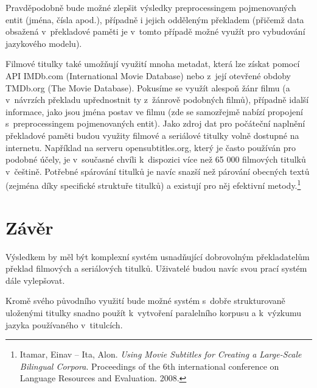 Pravděpodobně bude možné zlepšit výsledky preprocessingem pojmenovaných entit (jména, čísla apod.), případně i jejich odděleným překladem (přičemž data obsažená v~překladové paměti je v~tomto případě možné využít pro vybudování jazykového modelu).

Filmové titulky také umožňují využití mnoha metadat, která lze získat pomocí API IMDb.com (International Movie Database) nebo z~její otevřené obdoby TMDb.org (The Movie Database). Pokusíme se využít alespoň žánr filmu (a v~návrzích překladu upřednostnit ty z~žánrově podobných filmů), případně idalší informace, jako jsou jména postav ve filmu (zde se samozřejmě nabízí propojení s~preprocessingem pojmenovaných entit).
Jako zdroj dat pro počáteční naplnění překladové paměti budou využity filmové a seriálové titulky volně dostupné na internetu. Například na serveru opensubtitles.org, který je často používán pro podobné účely, je v~současné chvíli k~dispozici více než 65 000 filmových titulků v~češtině. Potřebné spárování titulků je navíc snazší než párování obecných textů (zejména díky specifické struktuře titulků) a existují pro něj efektivní metody.\footnote{Itamar, Einav – Ita, Alon. \emph{Using Movie Subtitles for Creating a Large-Scale Bilingual Corpora}. Proceedings of the 6th international conference on Language Resources and Evaluation. 2008.}

\section{Závěr}
Výsledkem by měl být komplexní systém usnadňující dobrovolným překladatelům překlad filmových a seriálových titulků. Uživatelé budou navíc svou prací systém dále vylepšovat.

Kromě svého původního využití bude možné systém s~dobře strukturovaně uloženými titulky snadno použít k~vytvoření paralelního korpusu a k~výzkumu jazyka používaného v~titulcích.